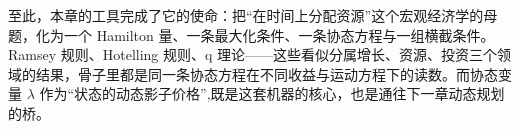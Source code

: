 
至此，本章的工具完成了它的使命：把``在时间上分配资源''这个宏观经济学的母题，化为一个 Hamilton 量、一条最大化条件、一条协态方程与一组横截条件。Ramsey 规则、Hotelling 规则、q 理论——这些看似分属增长、资源、投资三个领域的结果，骨子里都是同一条协态方程在不同收益与运动方程下的读数。而协态变量 $\lambda$ 作为``状态的动态影子价格'',既是这套机器的核心，也是通往下一章动态规划的桥。
